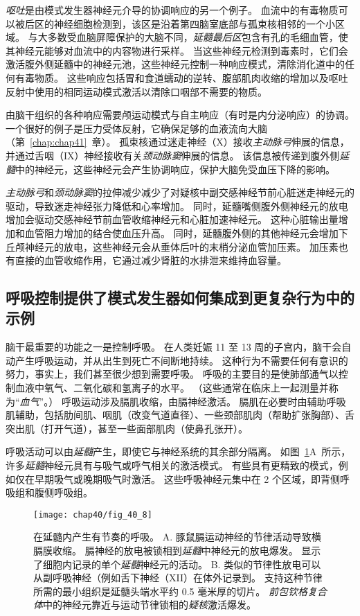 \textit{呕吐}是由模式发生器神经元介导的协调响应的另一个例子。
血流中的有毒物质可以被后区的神经细胞检测到，该区是沿着第四脑室底部与孤束核相邻的一个小区域。
与大多数受血脑屏障保护的大脑不同，\textit{延髓最后区}包含有孔的毛细血管，使其神经元能够对血流中的内容物进行采样。
当这些神经元检测到毒素时，它们会激活腹外侧延髓中的神经元池，这些神经元控制一种响应模式，清除消化道中的任何有毒物质。
这些响应包括胃和食道蠕动的逆转、腹部肌肉收缩的增加以及呕吐反射中使用的相同运动模式激活以清除口咽部不需要的物质。


由脑干组织的各种响应需要颅运动模式与自主响应（有时是内分泌响应）的协调。
一个很好的例子是压力受体反射，它确保足够的血液流向大脑（第~\ref{chap:chap41}~章）。
孤束核通过迷走神经（X）接收\textit{主动脉弓}伸展的信息，并通过舌咽（IX）神经接收有关\textit{颈动脉窦}伸展的信息。
该信息被传递到腹外侧\textit{延髓}中的神经元，这些神经元会产生协调响应，保护大脑免受血压下降的影响。


\textit{主动脉弓}和\textit{颈动脉窦}的拉伸减少减少了对疑核中副交感神经节前心脏迷走神经元的驱动，导致迷走神经张力降低和心率增加。
同时，延髓嘴侧腹外侧神经元的放电增加会驱动交感神经节前血管收缩神经元和心脏加速神经元。
这种心脏输出量增加和血管阻力增加的结合使血压升高。
同时，延髓腹外侧的其他神经元会增加下丘颅神经元的放电，这些神经元会从垂体后叶的末梢分泌血管加压素。
加压素也有直接的血管收缩作用，它通过减少肾脏的水排泄来维持血容量。



\subsection{呼吸控制提供了模式发生器如何集成到更复杂行为中的示例}

脑干最重要的功能之一是控制呼吸。
在人类妊娠 11 至 13 周的子宫内，脑干会自动产生呼吸运动，并从出生到死亡不间断地持续。
这种行为不需要任何有意识的努力，事实上，我们甚至很少想到需要呼吸。
呼吸的主要目的是使肺部通气以控制血液中氧气、二氧化碳和氢离子的水平。
（这些通常在临床上一起测量并称为“\textit{血气}”。）
呼吸运动涉及膈肌收缩，由膈神经激活。
膈肌在必要时由辅助呼吸肌辅助，包括肋间肌、咽肌（改变气道直径）、一些颈部肌肉（帮助扩张胸部）、舌突出肌（打开气道），甚至一些面部肌肉（使鼻孔张开）。


呼吸活动可以由\textit{延髓}产生，即使它与神经系统的其余部分隔离。
如图~\ref{fig:40_8}A~所示，许多\textit{延髓}神经元具有与吸气或呼气相关的激活模式。
有些具有更精致的模式，例如仅在早期吸气或晚期吸气时激活。
这些呼吸神经元集中在 2 个区域，即背侧呼吸组和腹侧呼吸组。


\begin{figure}[htbp]
	\centering
	\texttt{[image: chap40/fig\_40\_8]}
	\caption{在延髓内产生有节奏的呼吸。 
		A. 豚鼠膈运动神经的节律活动导致横膈膜收缩。
		膈神经的放电被锁相到\textit{延髓}中神经元的放电爆发。
		显示了细胞内记录的单个\textit{延髓}神经元的活动\cite{richerson1987maintenance}。
		B. 类似的节律性放电可以从副呼吸神经（例如舌下神经（XII）在体外记录到。
		支持这种节律所需的最小组织是延髓头端水平约 0.5 毫米厚的切片。
		\textit{前包钦格复合体}中的神经元靠近与运动节律锁相的\textit{疑核}激活爆发\cite{smith1991pre}。}
	\label{fig:40_8}
\end{figure}


